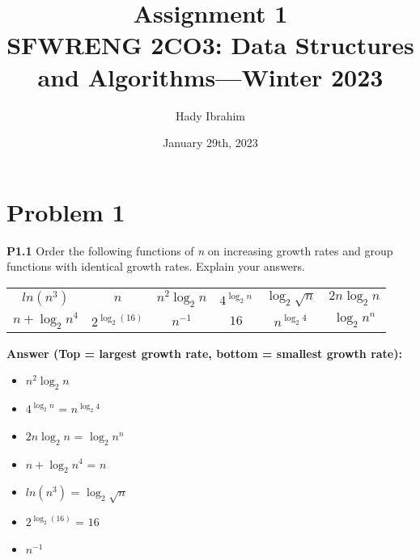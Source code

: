 \documentclass{article}
\title{Assignment 1 \\ SFWRENG 2CO3: Data Structures and Algorithms---Winter 2023
}
\author{Hady Ibrahim}
\date{January 29th, 2023}
\begin{document}
\maketitle

\section*{Problem 1}
\textbf {P1.1} Order the following functions of \textit{n} on increasing growth rates and group functions with identical growth rates. Explain your answers.

\begin{center}
\begin{tabular}{ c c c c c c }
 $ln(n^3)$ & $n$ & $n^2\log _{2} n$ & $4^{\log _{2} n}$ & $\log _2 \sqrt{n}$ & $2n\log _2 n$\\ 
 $n+ \log _2 n^4 $ & $2^{\log _2(16)}$ & $n^{-1}$ & $16$ & $n^{\log _2 4}$ & $\log _2 n^n$    
\end{tabular}
\end{center}

\noindent \textbf{Answer (Top = largest growth rate, bottom = smallest growth rate): }\\

\vspace{-15pt} \begin{itemize}
  \item $n^2\log _{2} n$
  \item $4^{\log _{2} n}$ = $n^{\log _2 4}$
  \item $2n\log _2 n$ = $\log _2 n^n$
  \item $n+ \log _2 n^4 $ = $n$ 
  \item $ln(n^3)$ = $\log _2 \sqrt{n}$
  \item $2^{\log _2(16)}$ = $16$
  \item $n^{-1}$
\end{itemize}
\end{document}
